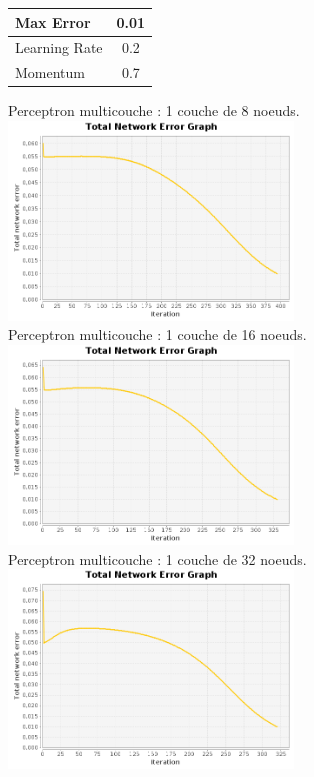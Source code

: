 \documentclass[10pt]{report}
\begin{document}
\begin{center}

\begin{tabular}{|l|c|}
	\hline
	Max Error & 0.01 \\
	\hline
	Learning Rate & 0.2 \\
	\hline
	Momentum & 0.7 \\
	\hline
\end{tabular}

Perceptron multicouche : 1 couche de 8 noeuds.\\
\includegraphics[height=200px]{img/SQUARE_8_21.png}\\
Perceptron multicouche : 1 couche de 16 noeuds.\\
\includegraphics[height=200px]{img/SQUARE_16_21.png}\\
Perceptron multicouche : 1 couche de 32 noeuds.\\
\includegraphics[height=200px]{img/SQUARE_32_21.png}\\

\end{center}
\end{document}
